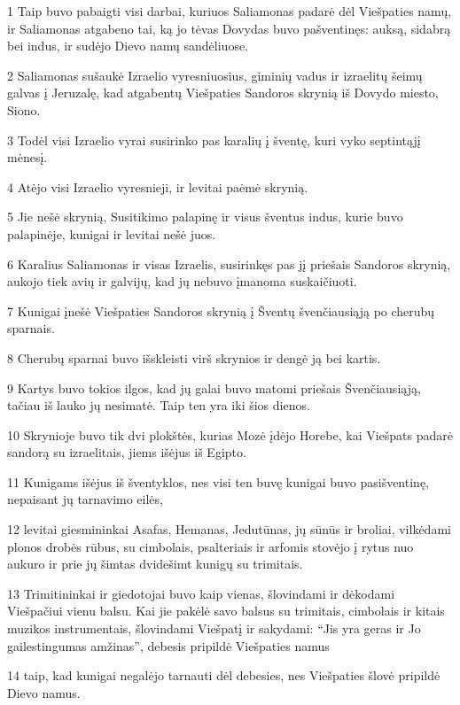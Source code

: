 \par 1 Taip buvo pabaigti visi darbai, kuriuos Saliamonas padarė dėl Viešpaties namų, ir Saliamonas atgabeno tai, ką jo tėvas Dovydas buvo pašventinęs: auksą, sidabrą bei indus, ir sudėjo Dievo namų sandėliuose. 
\par 2 Saliamonas sušaukė Izraelio vyresniuosius, giminių vadus ir izraelitų šeimų galvas į Jeruzalę, kad atgabentų Viešpaties Sandoros skrynią iš Dovydo miesto, Siono. 
\par 3 Todėl visi Izraelio vyrai susirinko pas karalių į šventę, kuri vyko septintąjį mėnesį. 
\par 4 Atėjo visi Izraelio vyresnieji, ir levitai paėmė skrynią. 
\par 5 Jie nešė skrynią, Susitikimo palapinę ir visus šventus indus, kurie buvo palapinėje, kunigai ir levitai nešė juos. 
\par 6 Karalius Saliamonas ir visas Izraelis, susirinkęs pas jį priešais Sandoros skrynią, aukojo tiek avių ir galvijų, kad jų nebuvo įmanoma suskaičiuoti. 
\par 7 Kunigai įnešė Viešpaties Sandoros skrynią į Šventų švenčiausiąją po cherubų sparnais. 
\par 8 Cherubų sparnai buvo išskleisti virš skrynios ir dengė ją bei kartis. 
\par 9 Kartys buvo tokios ilgos, kad jų galai buvo matomi priešais Švenčiausiąją, tačiau iš lauko jų nesimatė. Taip ten yra iki šios dienos. 
\par 10 Skrynioje buvo tik dvi plokštės, kurias Mozė įdėjo Horebe, kai Viešpats padarė sandorą su izraelitais, jiems išėjus iš Egipto. 
\par 11 Kunigams išėjus iš šventyklos, nes visi ten buvę kunigai buvo pasišventinę, nepaisant jų tarnavimo eilės, 
\par 12 levitai giesmininkai Asafas, Hemanas, Jedutūnas, jų sūnūs ir broliai, vilkėdami plonos drobės rūbus, su cimbolais, psalteriais ir arfomis stovėjo į rytus nuo aukuro ir prie jų šimtas dvidešimt kunigų su trimitais. 
\par 13 Trimitininkai ir giedotojai buvo kaip vienas, šlovindami ir dėkodami Viešpačiui vienu balsu. Kai jie pakėlė savo balsus su trimitais, cimbolais ir kitais muzikos instrumentais, šlovindami Viešpatį ir sakydami: “Jis yra geras ir Jo gailestingumas amžinas”, debesis pripildė Viešpaties namus 
\par 14 taip, kad kunigai negalėjo tarnauti dėl debesies, nes Viešpaties šlovė pripildė Dievo namus.



